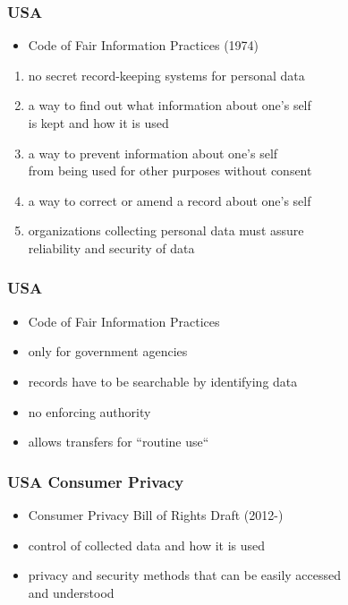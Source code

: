 \documentclass[dvipsnames]{beamer}
\theoremstyle{plain}
\begin{document}
\begin{frame}
  \frametitle{USA}

  \begin{itemize}
   \item Code of Fair Information Practices (1974)
  \end{itemize}

  \begin{enumerate}
    \item no secret record-keeping systems for personal data
    \item a way to find out what information about one's self\\
      is kept and how it is used
    \item a way to prevent information about one's self\\
      from being used for other purposes without consent
    \item a way to correct or amend a record about one's self
    \item organizations collecting personal data must assure\\
      reliability and security of data
  \end{enumerate}
\end{frame}

\begin{frame}
  \frametitle{USA}

  \begin{itemize}
    \item Code of Fair Information Practices
    \smallskip
    \item only for government agencies
    \item records have to be searchable by identifying data
    \item no enforcing authority
    \item allows transfers for ``routine use``
  \end{itemize}
\end{frame}

\begin{frame}
  \frametitle{USA Consumer Privacy}

  \begin{itemize}
    \item Consumer Privacy Bill of Rights Draft (2012-)
    \smallskip
    \item control of collected data and how it is used
    \item privacy and security methods that can be easily accessed\\
      and understood
  \end{itemize}
\end{frame}
\end{document}
